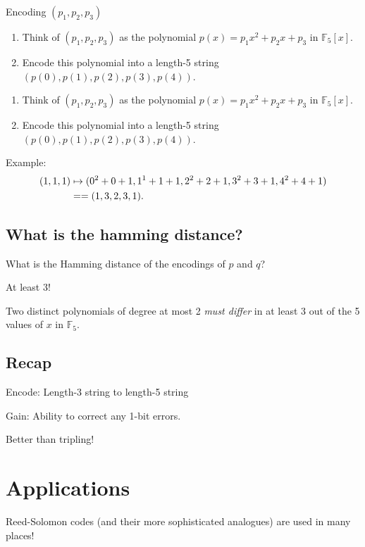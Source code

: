 \documentclass[11pt]{article}
\begin{document}
Encoding \((p_1, p_2, p_3)\)
\begin{enumerate}
\item Think of \((p_1,p_2,p_3)\) as the polynomial \(p(x) = p_1 x^2 + p_2 x + p_3\) in \(\mathbb F_5[x]\).
\item Encode this polynomial into a length-5 string \((p(0),p(1),p(2),p(3),p(4))\).
\end{enumerate}

\begin{enumerate}
\item Think of \((p_1,p_2,p_3)\) as the polynomial \(p(x) = p_1 x^2 + p_2 x + p_3\) in \(\mathbb F_5[x]\).
\item Encode this polynomial into a length-5 string \((p(0),p(1),p(2),p(3),p(4))\).
\end{enumerate}

Example:
\begin{align*}
(1,1,1) &\mapsto {\small (0^2+0+1, 1^1+1+1, 2^2+2+1, 3^2+3+1, 4^2+4+1)} \\
&== (1,3,2,3,1).
\end{align*}

\subsection*{What is the hamming distance?}
\label{sec:org91224a6}
What is the Hamming distance of the encodings of \(p\) and \(q\)?

At least 3!

Two distinct polynomials of degree at most 2 \emph{must differ} in at least 3 out of the 5 values of \(x\) in \(\mathbb F_5\).

\subsection*{Recap}
\label{sec:orgbe47483}
Encode: Length-3 string to length-5 string

Gain: Ability to correct any 1-bit errors.

Better than tripling!

\section*{Applications}
\label{sec:orgaec01ea}
Reed-Solomon codes (and their more sophisticated analogues) are used in many places!
\end{document}
